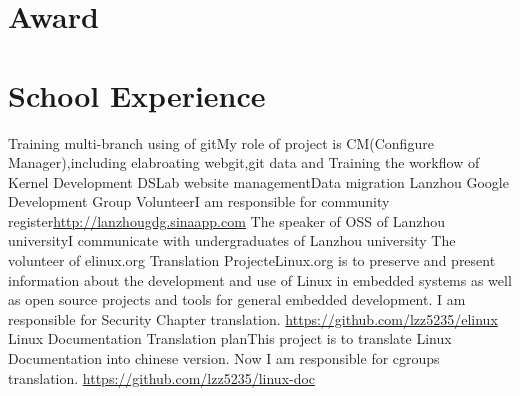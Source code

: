 \documentclass[11pt,a4paper]{moderncv}
\begin{document}
\section{Award}

\section{School Experience } %
{Training multi-branch using of git}{}{}{}{My role of project is CM(Configure Manager),including elabroating webgit,git data and Training the workflow of Kernel Development}
{DSLab website management}{}{}{}{Data migration}
{Lanzhou Google Development Group Volunteer}{}{}{}{I am responsible for community register\url{http://lanzhougdg.sinaapp.com}}
{The speaker of OSS of Lanzhou university}{}{}{}{I communicate with undergraduates of Lanzhou university}
{The volunteer of elinux.org Translation Project}{}{}{}{eLinux.org is to preserve and present information about the development and use of Linux in embedded systems as well as open source projects and tools for general embedded development. I am responsible for Security Chapter translation. \url{https://github.com/lzz5235/elinux}}
{Linux Documentation  Translation plan}{}{}{}{This project is to translate Linux Documentation into chinese version. Now I am responsible for cgroups translation. \url{https://github.com/lzz5235/linux-doc}}

\closesection{}                   %
\renewcommand{\listitemsymbol}{-} %

\nocite{*}


\end{document}
